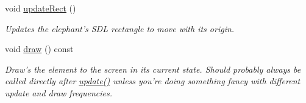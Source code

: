 \begin{DoxyCompactItemize}
void \hyperlink{classGUI_1_1Element_adf034ad835dcf131f4cd4cc6d5bea774}{update\-Rect} ()
\begin{DoxyCompactList}\small\item\em Updates the elephant's S\-D\-L rectangle to move with its origin. \end{DoxyCompactList}\item 
void \hyperlink{classGUI_1_1Element_ab6b8e34ae9f4e86976134074d124c814}{draw} () const 
\begin{DoxyCompactList}\small\item\em Draw's the element to the screen in its current state. Should probably always be called directly after \hyperlink{classGUI_1_1Element_ac33ecb92a9f9cb810bea83f31e4c14c9}{update()} unless you're doing something fancy with different update and draw frequencies. \end{DoxyCompactList}\end{DoxyCompactItemize}
